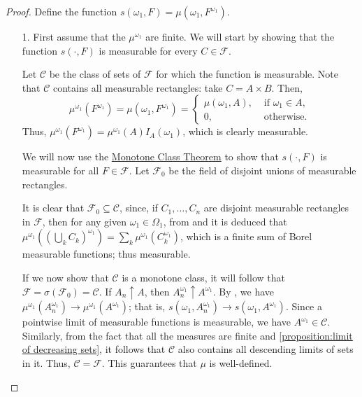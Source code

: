 \begin{proof}
Define the function \(s(\omega_1,F)=\mu\left(\omega_1,F^{\omega_1}\right)\).

  \begin{enumerate}
      \item[1.] First assume that the \(\mu^{\omega_1}\) are finite.
          We will start by showing that the function
		  \(s(\cdot,F)\) is measurable for every \(C\in\mathcal{F}\).

		  Let \(\mathcal{C}\) be the class of sets of \(\mathcal{F}\) for which the function is measurable.
		  Note that \(\mathcal{C}\) contains all measurable rectangles: take \(C=A\times B\).
		  Then,
		  \[\mu^{\omega_1}(F^{\omega_1})=\mu(\omega_{1	},F^{\omega_1})=\left\{\begin{array}{rl}
													 \mu(\omega_{1	},A),& \text{ if }\omega_{1	}\in A,\\
													 0,& \text{ otherwise.}

												   \end{array}\right.\]
Thus, \(\mu^{\omega_1}(F^{\omega_1})=\mu^{\omega_1}(A)I_A(\omega_1)\),
          which is clearly measurable.

					We will now use the \hyperref[theorem:Monotone Class Theorem]{Monotone Class Theorem}
          to show that \(s(\cdot,F)\) is measurable for all \(F\in\mathcal{F}\). Let \(\mathcal{F}_0\) be the
          field of disjoint unions of measurable rectangles.

          It is clear that \(\mathcal{F}_0\subseteq\mathcal{C}\), since, if
          \(C_1,\dotsc,C_n\) are disjoint measurable rectangles in  \(\mathcal{F}\), then for any
          given \(\omega_1\in\Omega_1\), from  and  
          it is deduced that \(\mu^{\omega_1}(\left(
          \bigcup_{k}C_k\right)^{\omega_1})=\sum_{k}\mu^{\omega_1}\left(C_k^{\omega_1}\right)\),
          which is a finite sum of Borel measurable functions; thus measurable.

          If we now show that \(\mathcal{C}\) is a monotone class, it will follow
          that \(\mathcal{F}=\sigma\left(\mathcal{F}_0\right)=\mathcal{C}\). If 
          \(A_n\uparrow A\), then  \(A_n^{\omega_1}\uparrow 
          A^{\omega_1}\). By , 
          we have \(\mu^{\omega_1}\left( 
          A_n^{\omega_1}\right)\to\mu^{\omega_1}\left(A^{\omega_1}\right)\); that is, \(s(\omega_1,A_n^{\omega_1})\to s(\omega_1,A^{\omega_1})\). Since a pointwise limit of measurable functions is measurable, we have  \(A^{\omega_1}\in\mathcal{C}\).
          Similarly, from the fact that all the measures are finite and \ref{proposition:limit of decreasing sets}, it
          follows that \(\mathcal{C}\) also contains all descending limits
          of sets in it. Thus, \(\mathcal{C}=\mathcal{F}\). This guarantees
          that \(\mu\) is well-defined.


\end{enumerate}
\end{proof}

